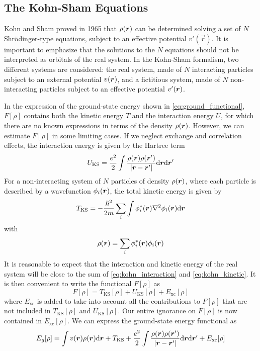 \subsection{The Kohn-Sham Equations}
Kohn and Sham proved in 1965 that $\rho(\mathbf{\boldsymbol{r}})$ can be determined solving a set of $N$ Shrödinger-type equations, subject to an effective potential $v'(\vec{r})$. It is important to emphasize that the solutions to the $N$ equations should not be interpreted as orbitals of the real system. In the Kohn-Sham formalism, two different systems are considered: the real system, made of $N$ interacting particles subject to an external potential $v(\mathbf{\boldsymbol{r}})$, and a fictitious system, made of $N$ non-interacting particles subject to an effective potential $v'(\mathbf{\boldsymbol{r}})$.

In the expression of the ground-state energy shown in \cref{eq:ground_functional}, $F[\rho]$ contains both the kinetic energy $T$ and the interaction energy $U$, for which there are no known expressions in terms of the density $\rho(\mathbf{\boldsymbol{r}})$. However, we can estimate $F[\rho]$ in some limiting cases. If we neglect exchange and correlation effects, the interaction energy is given by the Hartree term
\begin{equation} \label{eq:kohn_interaction}
    U_\text{KS} = \frac{e^2}{2} \int \frac{\rho(\vec{r})\rho(\vec{r}')}{|\vec{r}-\vec{r}'|}  \dr \dr'
\end{equation}
For a non-interacting system of $N$ particles of density $\rho(\mathbf{\boldsymbol{r}})$, where each particle is described by a wavefunction $\phi_i(\mathbf{\boldsymbol{r}})$, the total kinetic energy is given by
\begin{equation} \label{eq:kohn_kinetic}
    T_\text{KS} = -\frac{\hslash^2}{2m}\sum_i \int \rr{\phi_i^*} \laplacian \rr{\phi_i} \dr
\end{equation}
with
\begin{equation}
    \rho(\mathbf{\boldsymbol{r}}) = \sum_i \phi_i^*(\mathbf{\boldsymbol{r}})\phi_i(\mathbf{\boldsymbol{r}})
\end{equation}
It is reasonable to expect that the interaction and kinetic energy of the real system will be close to the sum of \cref{eq:kohn_interaction} and \cref{eq:kohn_kinetic}. It is then convenient to write the functional $F[\rho]$ as
\begin{equation}
    F[\rho] = T_\text{KS}[\rho] + U_\text{KS}[\rho] + E_\text{xc}[\rho]
\end{equation}
where $E_\text{xc}$ is added to take into account all the contributions to $F[\rho]$ that are not included in $T_\text{KS}[\rho]$ and $U_\text{KS}[\rho]$. Our entire ignorance on $F[\rho]$ is now contained in $E_\text{xc}[\rho]$.  We can express the ground-state energy functional as
\begin{equation} \label{eq:kohn_ground}
    E_g[\rho] = \int \rr{v} \rr{\rho} \dr +  T_\text{KS} + \frac{e^2}{2} \int \frac{\rho(\vec{r})\rho(\vec{r}')}{|\vec{r}-\vec{r}'|}  \dr \dr' + E_\text{xc}[\rho]
\end{equation}


